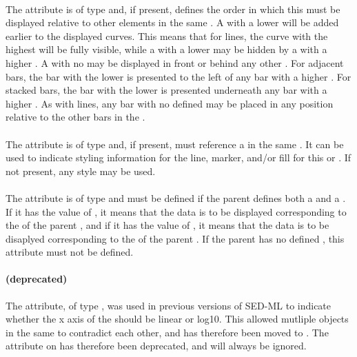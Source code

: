 \begin{blockChanged}
\paragraph*{}
The  attribute is of type  and, if present, defines the order in which this \Curve must be displayed relative to other \Curve elements in the same \Plot.  A \Curve with a lower  will be added earlier to the displayed curves.  This means that for lines, the curve with the highest  will be fully visible, while a \Curve with a lower  may be hidden by a \Curve with a higher .  A \Curve with no  may be displayed in front or behind any other \Curve.  For adjacent bars, the bar with the lower  is presented to the left of any bar with a higher .  For stacked bars, the bar with the lower  is presented underneath any bar with a higher .  As with lines, any bar with no  defined may be placed in any position relative to the other bars in the \Curve.

\paragraph*{}
The  attribute is of type \SIdRef and, if present, must reference a \Style in the same \SedDocument.  It can be used to indicate styling information for the line, marker, and/or fill for this \Curve or \ShadedArea.  If not present, any style may be used.

\paragraph*{}
The  attribute is of type  and must be defined if the parent \Plot defines both a  and a .  If it has the value of , it means that the data is to be displayed corresponding to the  of the parent \Plot, and if it has the value of , it means that the data is to be disaplyed corresponding to the  of the parent \Plot.  If the parent \Plot has no defined , this attribute must not be defined.

\paragraph*{ (deprecated)}
The  attribute, of type , was used in previous versions of SED-ML to indicate whether the x axis of the \Plot should be linear or log10.  This allowed mutliple \Curve objects in the same \Plot to contradict each other, and has therefore been moved to \Axis.  The  attribute on \Curve has therefore been deprecated, and will always be ignored.

\end{blockChanged}


